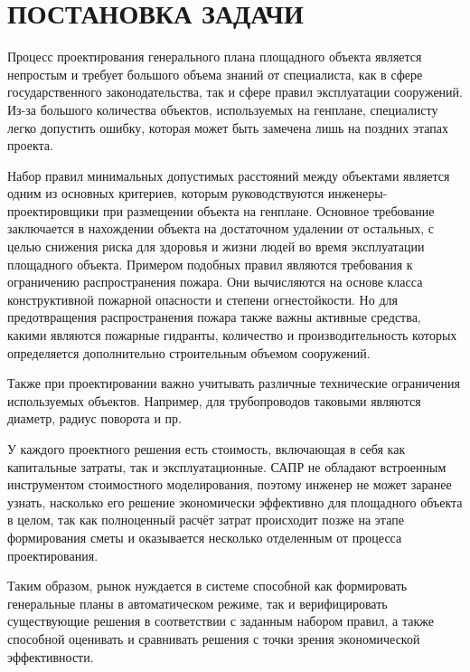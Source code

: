 \section*{\large{ПОСТАНОВКА ЗАДАЧИ}}


Процесс проектирования генерального плана площадного объекта является непростым
и требует большого объема знаний от специалиста, как в сфере государственного законодательства,
так и сфере правил эксплуатации сооружений.
Из-за большого количества объектов, используемых на генплане, специалисту легко допустить ошибку,
которая может быть замечена лишь на поздних этапах проекта.

Набор правил минимальных допустимых расстояний между объектами является одним из основных критериев,
которым руководствуются инженеры-проектировщики при размещении объекта на генплане.
Основное требование заключается в нахождении объекта на достаточном удалении от остальных,
с целью снижения риска для здоровья и жизни людей во время эксплуатации площадного объекта.
Примером подобных правил являются
требования к ограничению распространения пожара\cite{Fire}.
Они вычисляются на основе класса конструктивной пожарной опасности и степени огнестойкости.
Но для предотвращения распространения пожара также важны
активные средства, какими являются пожарные гидранты, количество и производительность которых определяется
дополнительно строительным объемом сооружений.

Также при проектировании важно учитывать различные технические ограничения используемых объектов.
Например, для трубопроводов таковыми являются диаметр, радиус поворота и пр.

У каждого проектного решения есть стоимость, включающая в себя как капитальные затраты, так и эксплуатационные.
САПР не обладают встроенным инструментом стоимостного моделирования,
поэтому инженер не может заранее узнать,
насколько его решение экономически эффективно для площадного объекта в целом,
так как полноценный расчёт затрат происходит позже на этапе формирования сметы
и оказывается несколько отделенным от процесса проектирования.

Таким образом, рынок нуждается в системе способной как формировать генеральные планы в автоматическом режиме,
так и верифицировать существующие решения в соответствии с заданным набором правил,
а также способной оценивать и сравнивать решения с точки зрения экономической эффективности.


